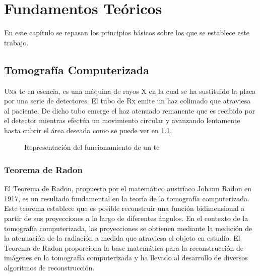 \chapter{Fundamentos Teóricos}
\label{chap:ft}
En este capítulo se repasan los principios básicos sobre los que se establece este trabajo.
\section{Tomografía Computerizada}
\lettrine{U}{na} \acrfull{tc} en esencia, es una máquina de rayos X en la cual se ha sustituido la placa por una serie de detectores\cite{muniz2006introduccion}. El tubo de Rx emite un haz colimado que atraviesa al paciente. De dicho tubo emerge el haz atenuado remanente que es recibido por el detector mientras efectúa un movimiento circular y avanzando lentamente hasta cubrir el área deseada como se puede ver en \ref{fig:tac}.
\begin{figure}%
    \centering
    \qquad
    \caption{Representación del funcionamiento de un \acrshort{tc}}%
    \label{fig:tac}%
\end{figure}

\subsection{Teorema de Radon}
El Teorema de Radon, propuesto por el matemático austríaco Johann Radon en 1917, es un resultado fundamental en la teoría de la tomografía computerizada. Este teorema establece que es posible reconstruir una función bidimensional a partir de sus proyecciones a lo largo de diferentes ángulos. En el contexto de la tomografía computerizada, las proyecciones se obtienen mediante la medición de la atenuación de la radiación a medida que atraviesa el objeto en estudio. El Teorema de Radon proporciona la base matemática para la reconstrucción de imágenes en la tomografía computerizada y ha llevado al desarrollo de diversos algoritmos de reconstrucción.

